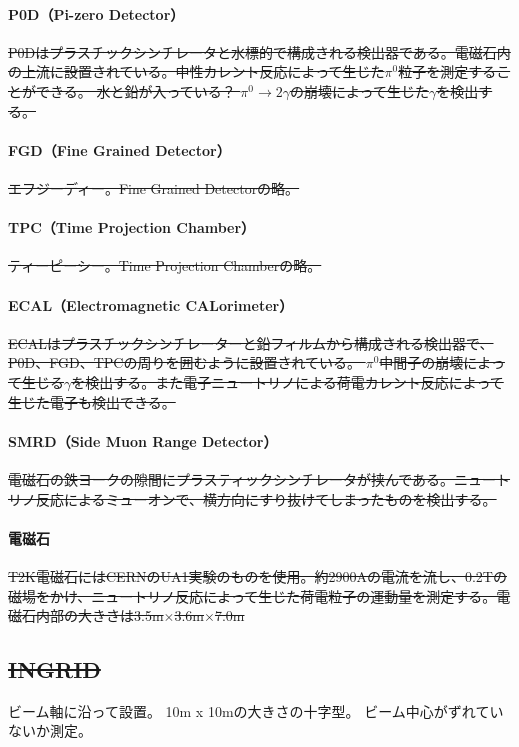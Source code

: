 \paragraph{P0D（Pi-zero Detector）}
\sout{P0Dはプラスチックシンチレータと水標的で構成される検出器である。電磁石内の上流に設置されている。中性カレント反応によって生じた$\pi^{0}$粒子を測定することができる。
水と鉛が入っている？
%
$\pi^{0} \rightarrow 2 \gamma$の崩壊によって生じた$\gamma$を検出する。}

\paragraph{FGD（Fine Grained Detector）}
\sout{エフジーディー。Fine Grained Detectorの略。}

\paragraph{TPC（Time Projection Chamber）}
\sout{ティーピーシー。Time Projection Chamberの略。}

\paragraph{ECAL（Electromagnetic CALorimeter）}
\sout{ECALはプラスチックシンチレーターと鉛フィルムから構成される検出器で、P0D、FGD、TPCの周りを囲むように設置されている。
$\pi^{0}$中間子の崩壊によって生じる$\gamma$を検出する。また電子ニュートリノによる荷電カレント反応によって生じた電子も検出できる。}

\paragraph{SMRD（Side Muon Range Detector）}
\sout{電磁石の鉄ヨークの隙間にプラスティックシンチレータが挟んである。ニュートリノ反応によるミューオンで、横方向にすり抜けてしまったものを検出する。}

\paragraph{電磁石}
\sout{T2K電磁石にはCERNのUA1実験のものを使用。約2900Aの電流を流し、0.2Tの磁場をかけ、ニュートリノ反応によって生じた荷電粒子の運動量を測定する。電磁石内部の大きさは3.5m$\times$3.6m$\times$7.0m}

\fi


\subsection{\sout{INGRID}}
ビーム軸に沿って設置。
10m x 10mの大きさの十字型。
ビーム中心がずれていないか測定。

